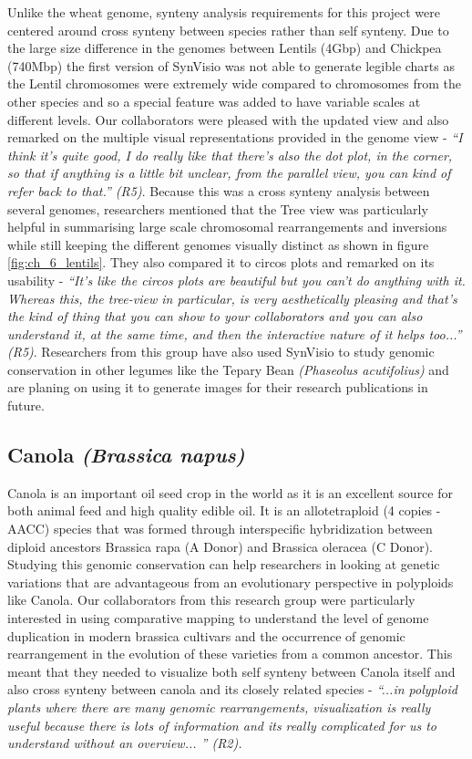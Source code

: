 Unlike the wheat genome, synteny analysis requirements for this project were centered around cross synteny between species rather than self synteny. Due to the large size difference in the genomes between Lentils (4Gbp) and Chickpea (740Mbp) the first version of SynVisio was not able to generate legible charts as the Lentil chromosomes were extremely wide compared to chromosomes from the other species and so a special feature was added to have variable scales at different levels. Our collaborators were pleased with the updated view and also remarked on the multiple visual representations provided in the genome view - \textit{``I think it's quite good, I do really like that there's also the dot plot, in the corner, so that if anything is a little bit unclear, from the parallel view, you can kind of refer back to that.'' (R5)}. Because this was a cross synteny analysis between several genomes, researchers mentioned that the Tree view was particularly helpful in summarising large scale chromosomal rearrangements and inversions while still keeping the different genomes visually distinct as shown in figure \ref{fig:ch_6_lentils}. They also compared it to circos plots and remarked on its usability - \textit{``It's like the circos plots are beautiful but you can't do anything with it. Whereas this, the tree-view in particular, is very aesthetically pleasing and that's the kind of thing that you can show to your collaborators and you can also understand it, at the same time, and then the interactive nature of it helps too...'' (R5)}. Researchers from this group have also used SynVisio to study genomic conservation in other legumes like the Tepary Bean \textit{(Phaseolus acutifolius)} and are planing on using it to generate images for their research publications in future.

\subsection{Canola\textit{ (Brassica napus)}}
Canola is an important oil seed crop in the world as it is an excellent source for both animal feed and high quality edible oil\cite{shahidi1990canola}. It is an allotetraploid (4 copies - AACC) species that was formed through interspecific hybridization between diploid ancestors Brassica rapa (A Donor) and Brassica oleracea (C Donor)\cite{parkin1995identification}. Studying this genomic conservation can help researchers in looking at genetic variations that are advantageous from an evolutionary perspective in polyploids like Canola. Our collaborators from this research group were particularly interested in using comparative mapping to understand the level of genome duplication in modern brassica cultivars and the occurrence of genomic rearrangement in the evolution of these varieties from a common ancestor. This meant that they needed to visualize both self synteny between Canola itself and also cross synteny between canola and its closely related species - \textit{``...in polyploid plants where there are many genomic rearrangements, visualization is really useful because there is lots of information and its really complicated for us to understand without an overview... '' (R2).}

